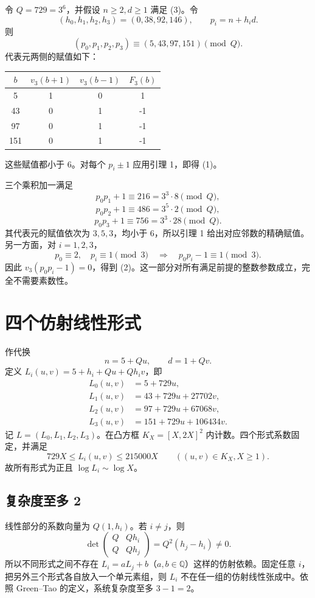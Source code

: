 \documentclass[11pt,a4paper]{ctexart}
\newcommand{\vthree}{v_3}\newcommand{\Fthree}{F_3}
\begin{document}
令 $Q=729=3^6$，并假设 $n\ge2,d\ge1$ 满足 (3)。令
\[
(h_0,h_1,h_2,h_3)=(0,38,92,146),\qquad p_i=n+h_id.
\]
则
\[
(p_0,p_1,p_2,p_3)\equiv(5,43,97,151)\pmod Q.
\]
代表元两侧的赋值如下：
\begin{center}
\begin{tabular}{c|ccc}
\toprule
$b$ & $\vthree(b+1)$ & $\vthree(b-1)$ & $\Fthree(b)$\\
\midrule
5&1&0&1\\43&0&1&-1\\97&0&1&-1\\151&0&1&-1\\
\bottomrule
\end{tabular}
\end{center}
这些赋值都小于 $6$。对每个 $p_i\pm1$ 应用引理 1，即得 (1)。

三个乘积加一满足
\[
p_0p_1+1\equiv216=3^3\cdot8\pmod Q,
\]
\[
p_0p_2+1\equiv486=3^5\cdot2\pmod Q,
\]
\[
p_0p_3+1\equiv756=3^3\cdot28\pmod Q.
\]
其代表元的赋值依次为 $3,5,3$，均小于 $6$，所以引理 1 给出对应邻数的精确赋值。另一方面，对 $i=1,2,3$，
\[
p_0\equiv2,\quad p_i\equiv1\pmod3
\quad\Longrightarrow\quad
p_0p_i-1\equiv1\pmod3.
\]
因此 $\vthree(p_0p_i-1)=0$，得到 (2)。这一部分对所有满足前提的整数参数成立，完全不需要素数性。

\section{四个仿射线性形式}
作代换
\[
n=5+Qu,\qquad d=1+Qv.\tag{4}
\]
定义 $L_i(u,v)=5+h_i+Qu+Qh_iv$，即
\[
\begin{aligned}
L_0(u,v)&=5+729u,\\
L_1(u,v)&=43+729u+27702v,\\
L_2(u,v)&=97+729u+67068v,\\
L_3(u,v)&=151+729u+106434v.
\end{aligned}
\]
记 $L=(L_0,L_1,L_2,L_3)$。在凸方框 $K_X=[X,2X]^2$ 内计数。四个形式系数固定，并满足
\[
729X\le L_i(u,v)\le215000X\qquad((u,v)\in K_X,X\ge1).\tag{5}
\]
故所有形式为正且 $\log L_i\sim\log X$。

\subsection{复杂度至多 2}
线性部分的系数向量为 $Q(1,h_i)$。若 $i\ne j$，则
\[
\det\begin{pmatrix}Q&Qh_i\\Q&Qh_j\end{pmatrix}=Q^2(h_j-h_i)\ne0.
\]
所以不同形式之间不存在 $L_i=aL_j+b$（$a,b\in\mathbb Q$）这样的仿射依赖。固定任意 $i$，把另外三个形式各自放入一个单元素组，则 $L_i$ 不在任一组的仿射线性张成中。依照 Green--Tao 的定义，系统复杂度至多 $3-1=2$。
\end{document}
